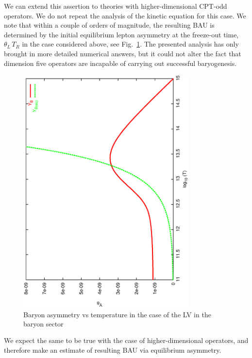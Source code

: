 \documentclass[12pt]{revtex4}
\begin{document}
	We can extend this assertion to theories with higher-dimensional 
	CPT-odd operators. 
	We do not repeat the analysis of the kinetic equation 
	for this case.
	We note that within a couple of orders of magnitude, the resulting BAU
	is determined by the initial equilibrium lepton asymmetry
	at the freeze-out time, $ \theta_L\,T_R $ in the case considered
	above, see Fig.~\ref{b_dom_asymm_bau}.
	The presented analysis has only brought in more 
	detailed numerical answers, but it could not alter the fact that
	dimension five operators are incapable of carrying out successful
	baryogenesis.
\begin{figure}
\includegraphics[width=9cm,angle=270]{b_dom_asymm_bau.ps}
\caption{Baryon asymmetry vs temperature in the case of the LV in the baryon sector}
\label{b_dom_asymm_bau}
\end{figure}
	
	We expect the same to be true with the case of higher-dimensional
	operators, and therefore make an estimate of resulting BAU 
	via equilibrium asymmetry.
\end{document}

